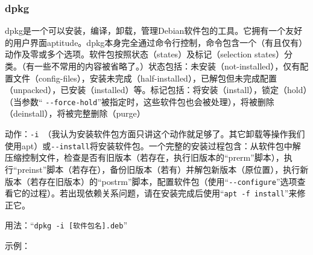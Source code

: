 \subsubsection{dpkg}
\cite{mandpkg}\par
dpkg是一个可以安装，编译，卸载，管理Debian软件包的工具。它拥有一个友好的用户界面aptitude。dpkg本身完全通过命令行控制，命令包含一个（有且仅有）动作及零或多个选项。软件包按照状态（states）及标记（selection states）分类。（有一些不常用的内容被省略了。）状态包括：未安装（not-installed），仅有配置文件（config-files），安装未完成（half-installed），已解包但未完成配置（unpacked），已安装（installed）等。标记包括：将安装（install），锁定（hold）（当参数“ \verb|--force-hold|”被指定时，这些软件包也会被处理），将被删除（deinstall），将被完整删除（purge）\par
动作：\verb|-i |（我认为安装软件包方面只讲这个动作就足够了。其它卸载等操作我们使用apt）或\verb|--install|将安装软件包。一个完整的安装过程包含：从软件包中解压缩控制文件，检查是否有旧版本（若存在，执行旧版本的“prerm”脚本），执行“preinst”脚本（若存在），备份旧版本（若有）并解包新版本（原位置），执行新版本（若存在旧版本）的“postrm”脚本，配置软件包（使用“\verb|--configure|”选项查看它的过程）。若出现依赖关系问题，请在安装完成后使用“\verb|apt -f install|”来修正它。\par
用法：“\verb|dpkg -i [软件包名].deb|”\par
示例：
